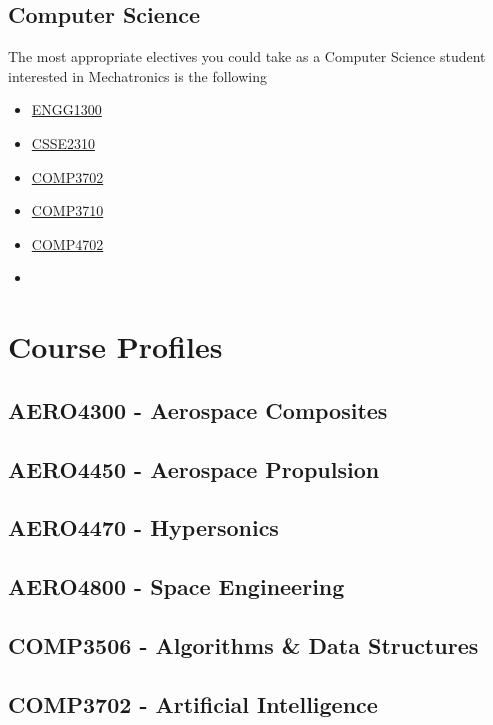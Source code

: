 \documentclass[a4paper,12pt]{report}
\begin{document}
\section{Computer Science}
The most appropriate electives you could take as a Computer Science student interested in Mechatronics is the following
\begin{multicols}{3}
    \begin{itemize}
        \item \hyperlink{ENGG1300}{ENGG1300}
        \item \hyperlink{CSSE2310}{CSSE2310}
        \item \hyperlink{COMP3702}{COMP3702}
        \item \hyperlink{COMP3710}{COMP3710}
        \item \hyperlink{COMP4702}{COMP4702}
        \item[]
    \end{itemize}
\end{multicols}


\chapter{Course Profiles}
\hypertarget{AERO4300}{\section{AERO4300 - Aerospace Composites}}

\hypertarget{AERO4450}{\section{AERO4450 - Aerospace Propulsion}}

\hypertarget{AERO4470}{\section{AERO4470 - Hypersonics}}

\hypertarget{AERO4800}{\section{AERO4800 - Space Engineering}}

\hypertarget{COMP3506}{\section{COMP3506 - Algorithms \& Data Structures}}

\hypertarget{COMP3702}{\section{COMP3702 - Artificial Intelligence}}
\end{document}
